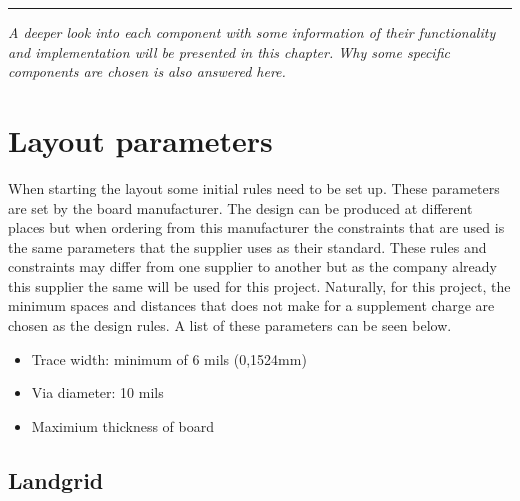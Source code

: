 
\vspace{-10ex}%
\rule{\textwidth}{0.3pt}
\vspace{5ex}

\textit{
A deeper look into each component with some information of their functionality and implementation will be presented in this chapter. Why some specific components are chosen is also answered here. 
}
\vspace{5ex}


\section{Layout parameters}

When starting the layout some initial rules need to be set up. These parameters are set by the board manufacturer.
The design can be produced at different places but when ordering from this manufacturer the constraints that are used is the same parameters that the supplier uses as their standard.
These rules and constraints may differ from one supplier to another but as the company already this supplier the same will be used for this project.
Naturally, for this project, the minimum spaces and distances that does not make for a supplement charge are chosen as the design rules. A list of these parameters can be seen below.

\begin{itemize}
\item Trace width: minimum of 6 mils (0,1524mm) 
\item Via diameter: 10 mils
\item Maximium thickness of board

\end{itemize}
 
\subsection{Landgrid}

